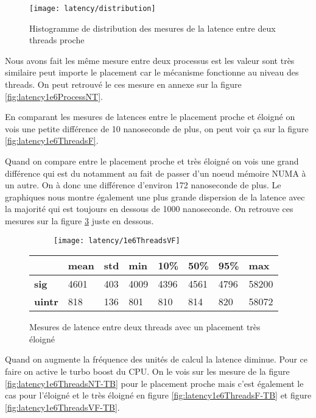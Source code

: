 \begin{figure}[H]
  \texttt{[image: latency/distribution]}
  \caption{Histogramme de distribution des mesures de la latence entre deux threads proche}
  \label{fig:distribution}
\end{figure}

Nous avons fait les même mesure entre deux processus est les valeur sont très similaire peut importe le placement car le mécanisme fonctionne au niveau des threads.
On peut retrouvé le ces mesure en annexe sur la figure \ref{fig:latency1e6ProcessNT}.

En comparant les mesures de latences entre le placement proche et éloigné on vois une petite différence de 10 nanoseconde de plus, on peut voir ça sur la figure \ref{fig:latency1e6ThreadsF}.

Quand on compare entre le placement proche et très éloigné on vois une grand différence qui est du notamment au fait de passer d'un noeud mémoire NUMA à un autre.
On à donc une différence d'environ 172 nanoseconde de plus.
Le graphiques nous montre également une plus grande dispersion de la latence avec la majorité qui est toujours en dessous de 1000 nanoseconde.
On retrouve ces mesures sur la figure \ref{fig:latency1e6ThreadsVF} juste en dessous.
\begin{figure}[H]
  \begin{subfigure}{\textwidth}
    \texttt{[image: latency/1e6ThreadsVF]}
    \caption{}
    \label{subfig:latency1e6ThreadsVF}
  \end{subfigure}
  \begin{subtable}{\textwidth}
    \centering
    \begin{tabular}{| l | l | l | l | l | l | l | l |}
      \hline
      &\bf mean &\bf std &\bf min  &\bf 10\% &\bf 50\% &\bf 95\% &\bf max\\
      \hline
      \bf sig   & 4601 & 403 & 4009 & 4396 & 4561 & 4796 & 58200\\
      \hline
      \bf uintr & 818  & 136 & 801  & 810  & 814  & 820  & 58072\\
      \hline
    \end{tabular}
    \caption{}
    \label{tab:latency1e6ThreadsVF}
  \end{subtable}
  \caption{Mesures de latence entre deux threads avec un placement très éloigné}
  \label{fig:latency1e6ThreadsVF}
\end{figure}


Quand on augmente la fréquence des unités de calcul la latence diminue.
Pour ce faire on active le turbo boost du CPU.
On le vois sur les mesure de la figure \ref{fig:latency1e6ThreadsNT-TB} pour le placement proche mais c'est également le cas pour l'éloigné et le très éloigné en figure \ref{fig:latency1e6ThreadsF-TB} et figure \ref{fig:latency1e6ThreadsVF-TB}.

